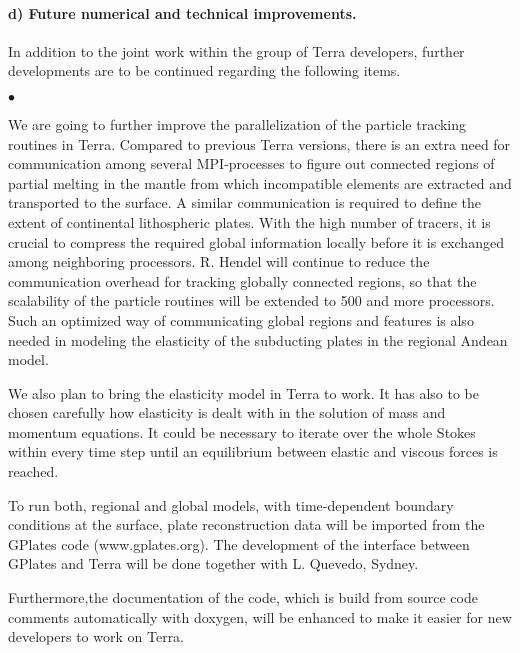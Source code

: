 \documentclass[twoside,10pt]{article}
\newenvironment{dlist}
   {\begin{list}
      {$\bullet$}
      {
      \setlength{\topsep}{0.5ex}
      \setlength{\partopsep}{0.0ex}
      \setlength{\parsep}{0.5ex}
      \setlength{\itemsep}{0.0ex}
      \setlength{\itemindent}{3.0ex}
      \setlength{\leftmargin}{0.0ex}
      \setlength{\labelsep}{1.0ex}
      }
   }
   {\end{list}}
\begin{document}
\paragraph{d) Future numerical and technical improvements.}
In addition to the joint work within the group of Terra developers, further developments are to be continued regarding the following items.
\begin{dlist}
\item We are going to further improve the parallelization of the particle tracking routines in Terra. 
Compared to previous Terra versions, there is an extra need for communication among several MPI-processes to figure out connected regions of partial melting in the mantle from which incompatible elements are extracted and transported to the surface. 
A similar communication is required to define the extent of continental lithospheric plates. 
With the high number of tracers, it is crucial to compress the required global information locally before it is exchanged among neighboring processors. 
R. Hendel will continue to reduce the communication overhead for tracking globally connected regions, so that the scalability of the particle routines will be extended to 500 and more processors. 
Such an optimized way of communicating global regions and features is also needed in modeling the elasticity of the subducting plates in the regional Andean model.
\item We also plan to bring the elasticity model in Terra to work. 
It has also to be chosen carefully how elasticity is dealt with in the solution of mass and momentum equations. 
It could be necessary to iterate over the whole Stokes within every time step until an equilibrium between elastic and viscous forces is reached.
\item To run both, regional and global models, with time-dependent boundary conditions at the surface, plate reconstruction data will be imported from the GPlates code \cite{Boyden2011} (www.gplates.org). 
The development of the interface between GPlates and Terra will be done together with L. Quevedo, Sydney.
\item Furthermore,the documentation of the code, which is build from source code comments automatically with doxygen, will be enhanced to make it easier  for new developers to work on Terra.
\end{dlist}



%
%
\end{document}
